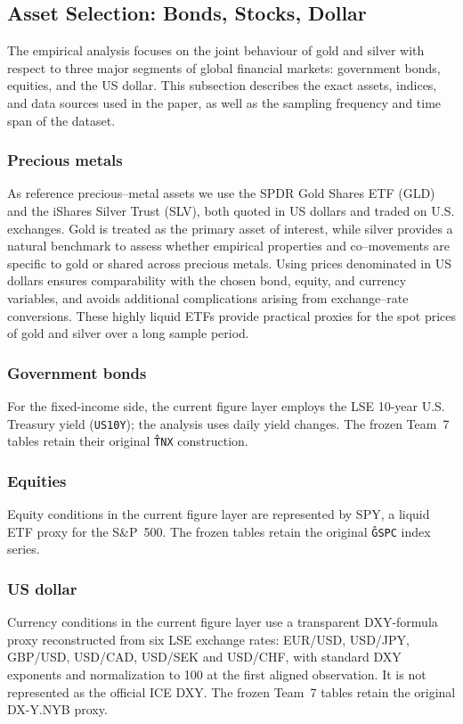 \subsection{Asset Selection: Bonds, Stocks, Dollar}
The empirical analysis focuses on the joint behaviour of gold and silver with respect to
three major segments of global financial markets: government bonds, equities, and the US
dollar. This subsection describes the exact assets, indices, and data sources used in the
paper, as well as the sampling frequency and time span of the dataset.
\subsubsection{Precious metals}

As reference precious–metal assets we use the SPDR Gold Shares ETF (GLD) and the iShares Silver Trust (SLV), both quoted in US dollars and traded on U.S. exchanges. Gold is treated as the primary asset of interest, while silver provides a
natural benchmark to assess whether empirical properties and co–movements are specific to
gold or shared across precious metals. Using prices denominated in US dollars ensures
comparability with the chosen bond, equity, and currency variables, and avoids additional
complications arising from exchange–rate conversions. These highly liquid ETFs provide practical proxies for the spot prices of gold and silver over a long sample period.
\subsubsection{Government bonds}

For the fixed-income side, the current figure layer employs the LSE 10-year
U.S. Treasury yield (\texttt{US10Y}); the analysis uses daily yield changes.
The frozen Team~7 tables retain their original \texttt{\^TNX} construction.
\subsubsection{Equities}

Equity conditions in the current figure layer are represented by SPY, a
liquid ETF proxy for the S\&P~500. The frozen tables retain the original
\texttt{\^GSPC} index series.
\subsubsection{US dollar}

Currency conditions in the current figure layer use a transparent DXY-formula
proxy reconstructed from six LSE exchange rates: EUR/USD, USD/JPY, GBP/USD,
USD/CAD, USD/SEK and USD/CHF, with standard DXY exponents and normalization to
100 at the first aligned observation. It is not represented as the official
ICE DXY. The frozen Team~7 tables retain the original DX-Y.NYB proxy.
